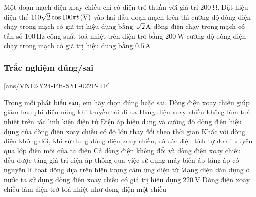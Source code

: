 \begin{ex}
	Một đoạn mạch điện xoay chiều chỉ có điện trở thuần với giá trị $\SI{200}{\ohm}$. Đặt hiệu điện thế $\xsi{100\sqrt{2}\cos100\pi t}{\left(\volt\right)}$ vào hai đầu đoạn mạch trên thì
	\choice
	{cường độ dòng điện chạy trong mạch có giá trị hiệu dụng bằng $\xsi{\sqrt{2}}{\ampere}$}
	{dòng điện chạy trong mạch có tần số $\SI{100}{\hertz}$}
	{công suất toả nhiệt trên điện trở bằng $\SI{200}{\watt}$}
	{\True cường độ dòng điện chạy trong mạch có giá trị hiệu dụng bằng $\SI{0.5}{\ampere}$}
	\loigiai{}
\end{ex}



\subsubsection{Trắc nghiệm đúng/sai}
\setcounter{ex}{0}
[ans/VN12-Y24-PH-SYL-022P-TF]
\begin{ex}
	Trong mỗi phát biểu sau, em hãy chọn đúng hoặc sai.
	\choiceTFt
	{\True Dòng điện xoay chiều giúp giảm hao phí điện năng khi truyền tải đi xa}
	{Dòng điện xoay chiều không làm toả nhiệt trên các linh kiện điện tử}
	{Điện áp hiệu dụng và cường độ dòng điện hiệu dụng của dòng điện xoay chiều có độ lớn thay đổi theo thời gian}
	{Khác với dòng điện không đổi, khi sử dụng dòng điện xoay chiều, có các điện tích tự do đi xuyên qua lớp điện môi của tụ điện}
	{Cả dòng điện không đổi và dòng điện xoay chiều đều được tăng giá trị điện áp thông qua việc sử dụng máy biến áp tăng áp có nguyên lí hoạt động dựa trên hiện tượng cảm ứng điện từ}
	{\True Mạng điện dân dụng ở nước ta sử dụng dòng điện xoay chiều có giá trị hiệu dụng $\SI{220}{\volt}$}
	{\True Dòng điện xoay chiều làm điện trở toả nhiệt như dòng điện một chiều}
	\loigiai{}
\end{ex}
